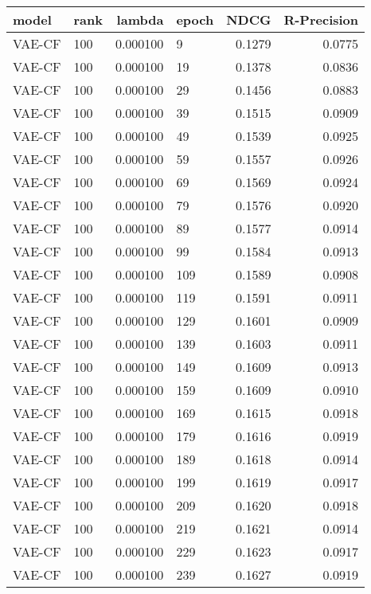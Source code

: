 \begin{tabular}{llrlrr}
\toprule
   model & rank &    lambda & epoch &    NDCG &  R-Precision \\
\midrule
  VAE-CF &  100 &  0.000100 &     9 &  0.1279 &       0.0775 \\
  VAE-CF &  100 &  0.000100 &    19 &  0.1378 &       0.0836 \\
  VAE-CF &  100 &  0.000100 &    29 &  0.1456 &       0.0883 \\
  VAE-CF &  100 &  0.000100 &    39 &  0.1515 &       0.0909 \\
  VAE-CF &  100 &  0.000100 &    49 &  0.1539 &       0.0925 \\
  VAE-CF &  100 &  0.000100 &    59 &  0.1557 &       0.0926 \\
  VAE-CF &  100 &  0.000100 &    69 &  0.1569 &       0.0924 \\
  VAE-CF &  100 &  0.000100 &    79 &  0.1576 &       0.0920 \\
  VAE-CF &  100 &  0.000100 &    89 &  0.1577 &       0.0914 \\
  VAE-CF &  100 &  0.000100 &    99 &  0.1584 &       0.0913 \\
  VAE-CF &  100 &  0.000100 &   109 &  0.1589 &       0.0908 \\
  VAE-CF &  100 &  0.000100 &   119 &  0.1591 &       0.0911 \\
  VAE-CF &  100 &  0.000100 &   129 &  0.1601 &       0.0909 \\
  VAE-CF &  100 &  0.000100 &   139 &  0.1603 &       0.0911 \\
  VAE-CF &  100 &  0.000100 &   149 &  0.1609 &       0.0913 \\
  VAE-CF &  100 &  0.000100 &   159 &  0.1609 &       0.0910 \\
  VAE-CF &  100 &  0.000100 &   169 &  0.1615 &       0.0918 \\
  VAE-CF &  100 &  0.000100 &   179 &  0.1616 &       0.0919 \\
  VAE-CF &  100 &  0.000100 &   189 &  0.1618 &       0.0914 \\
  VAE-CF &  100 &  0.000100 &   199 &  0.1619 &       0.0917 \\
  VAE-CF &  100 &  0.000100 &   209 &  0.1620 &       0.0918 \\
  VAE-CF &  100 &  0.000100 &   219 &  0.1621 &       0.0914 \\
  VAE-CF &  100 &  0.000100 &   229 &  0.1623 &       0.0917 \\
  VAE-CF &  100 &  0.000100 &   239 &  0.1627 &       0.0919 \\

\end{tabular}
